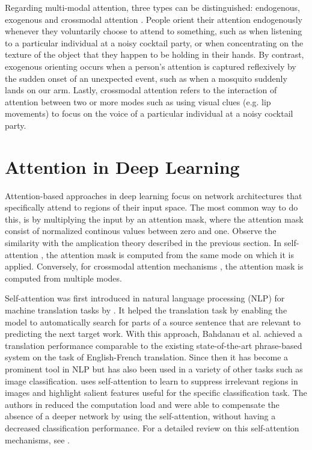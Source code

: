 Regarding multi-modal attention, three types can be distinguished: endogenous, exogenous and crossmodal attention \citep{crossmodal}. People orient their attention endogenously whenever they voluntarily choose to attend to something, such as when listening to a particular individual at a noisy cocktail party, or when concentrating on the texture of the object that they happen to be holding in their hands. By contrast, exogenous orienting occurs when a person’s attention is captured reflexively by the sudden onset of an unexpected event, such as when a mosquito suddenly lands on our arm. Lastly, crossmodal attention refers to the interaction of attention between two or more modes such as using visual clues (e.g. lip movements) to focus on the voice of a particular individual at a noisy cocktail party.


\section{Attention in Deep Learning}
Attention-based approaches in deep learning focus on network architectures that specifically attend to regions of their input space. The most common way to do this, is by multiplying the input by an attention mask, where the attention mask consist of normalized continous values between zero and one. Observe the similarity with the amplication theory described in the previous section. In self-attention \citep{bahdanau}, the attention mask is computed from the same mode on which it is applied. Conversely, for crossmodal attention mechanisms \citep{crossmodal-object-detection}, the attention mask is computed from multiple modes. 

Self-attention was first introduced in natural language processing (NLP) for machine translation tasks by \citep{bahdanau}. It helped the translation task by enabling the model to automatically search for parts of a source sentence that are relevant to predicting the next target work. With this approach, Bahdanau et al. achieved a translation performance comparable to the existing state-of-the-art phrase-based system on the task of English-French translation. Since then it has become a prominent tool in NLP but has also been used in a variety of other tasks such as image classification. \citep{self-capsule} uses self-attention to learn to suppress irrelevant regions in images and highlight salient features useful for the specific classification task. The authors in \citep{self-capsule} reduced the computation load and were able to compensate the absence of a deeper network by using the self-attention, without having a decreased classification performance. For a detailed review on this self-attention mechanisms, see \citep{attention-review}.

